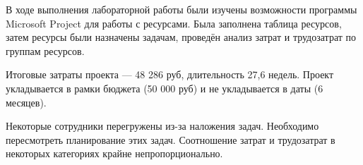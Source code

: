 В ходе выполнения лабораторной работы были изучены возможности
программы Microsoft Project для работы с ресурсами. Была заполнена таблица
ресурсов, затем ресурсы были назначены задачам, проведён анализ затрат и
трудозатрат по группам ресурсов.

Итоговые затраты проекта --- 48 286 руб, длительность 27,6 недель. Проект укладывается в рамки бюджета (50 000  руб) и не
укладывается в даты (6 месяцев).

Некоторые сотрудники перегружены из-за наложения задач. Необходимо
пересмотреть планирование этих задач. Соотношение затрат и трудозатрат в
некоторых категориях крайне непропорционально.

